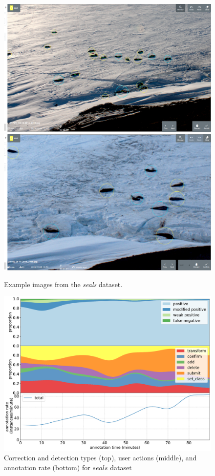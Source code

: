\begin{figure}[!h]
\centering
  \includegraphics[width=0.475\linewidth]{figures/annotation/screenshots/seals_small2.png}
  \hfill
  \includegraphics[width=0.45\linewidth]{figures/annotation/screenshots/seals_big.png}
  \caption{}
\caption{ Example images from the \emph{seals} dataset.}
\label {fig:seals_examples}
\end{figure}

\begin{figure}[!h]
\centering
\includegraphics[width=1.0\linewidth]{charts/action_annotations/seals1.pdf}
\caption{ Correction and detection types (top), user actions (middle), and annotation rate (bottom) for $seals$ dataset }
\label{fig:seals_annotation}
\end{figure}

